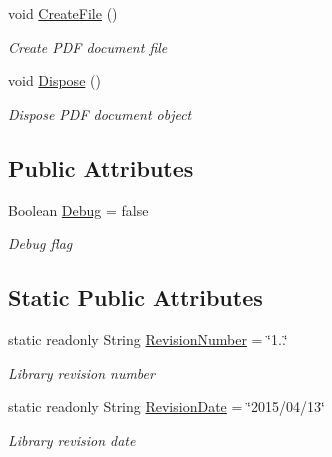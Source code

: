 \begin{DoxyCompactItemize}
void \hyperlink{class_pdf_file_writer_1_1_pdf_document_a55ba130033714cf182d37ce75208f2c0}{Create\+File} ()
\begin{DoxyCompactList}\small\item\em Create P\+DF document file \end{DoxyCompactList}\item 
void \hyperlink{class_pdf_file_writer_1_1_pdf_document_a1929b97a199614ce227544512c35417a}{Dispose} ()\hypertarget{class_pdf_file_writer_1_1_pdf_document_a1929b97a199614ce227544512c35417a}{}\label{class_pdf_file_writer_1_1_pdf_document_a1929b97a199614ce227544512c35417a}

\begin{DoxyCompactList}\small\item\em Dispose P\+DF document object \end{DoxyCompactList}\end{DoxyCompactItemize}
\subsection*{Public Attributes}
\begin{DoxyCompactItemize}
\item 
Boolean \hyperlink{class_pdf_file_writer_1_1_pdf_document_a4e010f4e1174d2f30bd5ff580837b8a8}{Debug} = false
\begin{DoxyCompactList}\small\item\em Debug flag \end{DoxyCompactList}\end{DoxyCompactItemize}
\subsection*{Static Public Attributes}
\begin{DoxyCompactItemize}
\item 
static readonly String \hyperlink{class_pdf_file_writer_1_1_pdf_document_a6139648f3e934f6fa99a13dd6aa13055}{Revision\+Number} = \char`\"{}1..\char`\"{}
\begin{DoxyCompactList}\small\item\em Library revision number \end{DoxyCompactList}\item 
static readonly String \hyperlink{class_pdf_file_writer_1_1_pdf_document_a38e355cdd3876f097b27b911577e264f}{Revision\+Date} = \char`\"{}2015/04/13\char`\"{}
\begin{DoxyCompactList}\small\item\em Library revision date \end{DoxyCompactList}\end{DoxyCompactItemize}
